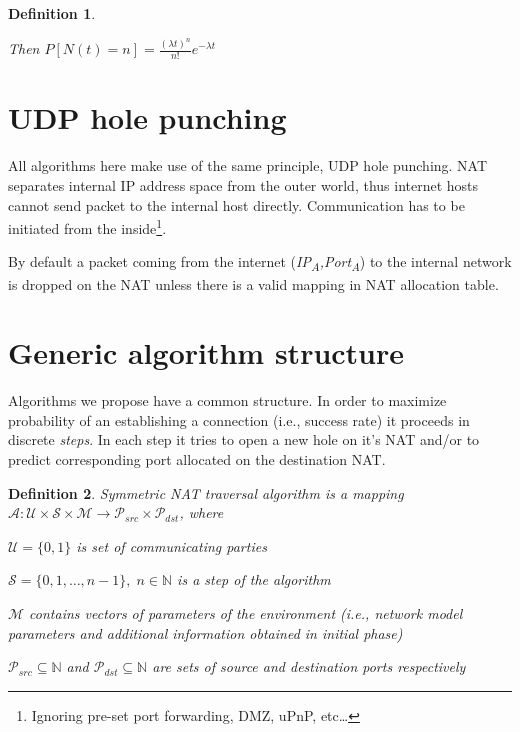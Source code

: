 \documentclass[twoside]{article}
\newtheorem{mydef}{Definition}
\begin{document}
\begin{multicols}{2}
\begin{mydef}
\begin{center}                                                     
Then $P[N(t)=n] = \frac{(\lambda t)^n}{n!} e^{-\lambda t}$
\end{center}
\end{mydef}

\section{UDP hole punching}
All algorithms here make use of the same principle, UDP hole punching. NAT separates internal
IP address space from the outer world, thus internet hosts cannot send packet to the 
internal host directly. Communication has to be initiated from the inside\footnote{Ignoring 
pre-set port forwarding, DMZ, uPnP, etc\dots}. 


 By default a packet 
coming from the internet (\textit{IP\textsubscript{A},Port\textsubscript{A}}) to the internal 
network is dropped on the NAT unless there is a valid mapping in NAT allocation table.

\section{Generic algorithm structure}
Algorithms we propose have a common structure. In order to maximize probability of an establishing
a connection (i.e., success rate) it proceeds in discrete \emph{steps}. In each step it 
tries to open a new hole on it's NAT and/or to predict corresponding port allocated on the destination
NAT.

\begin{mydef}
Symmetric NAT traversal algorithm is a mapping 
$\mathcal{A}: \mathcal{U} \times \mathcal{S} \times \mathcal{M} \rightarrow \mathcal{P}_{src} \times \mathcal{P}_{dst}$, 
where \\
\begin{compactitem}
\item $\mathcal{U}=\{0,1\}$ is set of communicating parties
\item $\mathcal{S} = \{0, 1, \dots, n-1\}, \; n \in \mathbb{N}$ is a step of the algorithm
\item $\mathcal{M}$ contains vectors of parameters of the environment (i.e., network model 
parameters and additional information obtained in initial phase)
\item $\mathcal{P}_{src} \subseteq \mathbb{N}$ and $\mathcal{P}_{dst} \subseteq \mathbb{N}$
are sets of source and destination ports respectively
\end{compactitem}
\end{mydef}


\end{multicols}
\end{document}
